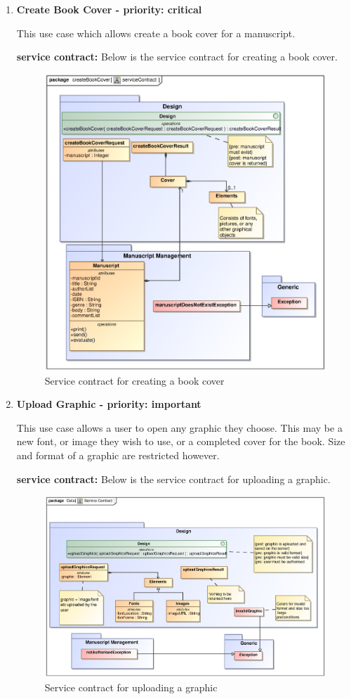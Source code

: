 \begin{enumerate}
\newpage
\item \textbf{Create Book Cover - priority: critical}
\par{This use case which allows create a book cover for a  manuscript.}
\par{\textbf{service contract:} Below is the service contract for creating a book cover.
}
 \begin{figure}[h]
\centering
\includegraphics[scale=0.8,width=400px]{epsImages/Design/createBookCover.eps}
\caption{Service contract for creating a book cover}
\end{figure}

\newpage
\item \textbf{Upload Graphic - priority: important}\\
\par{This use case allows a user to open any graphic they choose. This may be a new font, or image they wish to use, or a completed cover for the book. Size and format of a graphic are restricted however.}
\par{\textbf{service contract:} Below is the service contract for uploading a graphic.
}
\begin{figure}[h]
\centering
\includegraphics[scale=0.8,width=400px]{epsImages/Design/uploadGraphicsServiceContract.eps}
\caption{Service contract for uploading a graphic}
\end{figure}
\end{enumerate}
